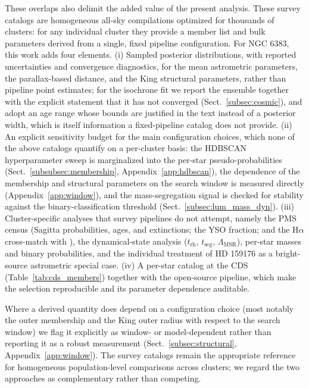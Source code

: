 \documentclass{aa}
\begin{document}
These overlaps also delimit the added value of the present analysis. These survey catalogs are homogeneous all-sky compilations optimized for thousands of clusters: for any individual cluster they provide a member list and bulk parameters derived from a single, fixed pipeline configuration. For NGC 6383, this work adds four elements\@. (i) Sampled posterior distributions, with reported uncertainties and convergence diagnostics, for the mean astrometric parameters, the parallax-based distance, and the King structural parameters, rather than pipeline point estimates; for the isochrone fit we report the ensemble together with the explicit statement that it has not converged (Sect.~\ref{subsec:cosmic}), and adopt an age range whose bounds are justified in the text instead of a posterior width, which is itself information a fixed-pipeline catalog does not provide\@. (ii) An explicit sensitivity budget for the main configuration choices, which none of the above catalogs quantify on a per-cluster basis: the HDBSCAN hyperparameter sweep is marginalized into the per-star pseudo-probabilities (Sect.~\ref{subsubsec:membership}, Appendix~\ref{app:hdbscan}), the dependence of the membership and structural parameters on the search window is measured directly (Appendix~\ref{app:window}), and the mass-segregation signal is checked for stability against the binary-classification threshold (Sect.~\ref{subsec:lum_mass_dyn})\@. (iii) Cluster-specific analyses that survey pipelines do not attempt, namely the PMS census (Sagitta probabilities, ages, and extinctions; the YSO fraction; and the H$\alpha$ cross-match with \citealt{2010AA...511A..25R}), the dynamical-state analysis ($t_{\mathrm{rh}}$, $t_{\mathrm{seg}}$, $\Lambda_{\mathrm{MSR}}$), per-star masses and binary probabilities, and the individual treatment of HD 159176 as a bright-source astrometric special case\@. (iv) A per-star catalog at the CDS (Table~\ref{tab:cds_members}) together with the open-source pipeline, which make the selection reproducible and its parameter dependence auditable.

Where a derived quantity does depend on a configuration choice (most notably the outer membership and the King outer radius with respect to the search window) we flag it explicitly as window- or model-dependent rather than reporting it as a robust measurement (Sect.~\ref{subsec:structural}, Appendix~\ref{app:window}). The survey catalogs remain the appropriate reference for homogeneous population-level comparisons across clusters; we regard the two approaches as complementary rather than competing.
\end{document}
